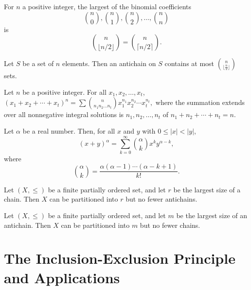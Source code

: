 \begin{corollary}
    \label{cor:5.3.2}
For \( n \) a positive integer, the largest of the binomial coefficients
\[
\binom{n}{0}, \binom{n}{1}, \binom{n}{2}, \ldots, \binom{n}{n}
\]
is
\[
\binom{n}{\lfloor n/2 \rfloor} = \binom{n}{\lceil n/2 \rceil}.
\]
\end{corollary}

\begin{theorem}
    \label{thm:5.3.3}
Let \( S \) be a set of \( n \) elements. Then an antichain on \( S \) contains at most \( \binom{n}{\lfloor \frac{n}{2} \rfloor} \) sets.
\end{theorem}

\begin{theorem}
    \label{thm:5.4.1}
Let \( n \) be a positive integer. For all \( x_1, x_2, \ldots, x_t \),
$
(x_1 + x_2 + \cdots + x_t)^n = \sum \binom{n}{n_1n_2\ldots n_t} x_1^{n_1} x_2^{n_2} \cdots x_t^{n_t},
$
where the summation extends over all nonnegative integral solutions is \( n_1, n_2, \ldots, n_t \) of \( n_1 + n_2 + \cdots + n_t = n \).
\end{theorem}

\begin{theorem}
    \label{thm:5.5.1}
Let \( \alpha \) be a real number. Then, for all \( x \) and \( y \) with \( 0 \leq |x| < |y| \),
\[
(x + y)^\alpha = \sum_{k=0}^{\infty} \binom{\alpha}{k} x^k y^{\alpha-k},
\]
where
\[
\binom{\alpha}{k} = \frac{\alpha(\alpha - 1) \cdots (\alpha - k + 1)}{k!}.
\]
\end{theorem}

\begin{theorem}
    \label{thm:5.6.1}
Let \((X, \leq)\) be a finite partially ordered set, and let \( r \) be the largest size of a chain. Then \( X \) can be partitioned into \( r \) but no fewer antichains.
\end{theorem}


\begin{theorem}
    \label{thm:5.6.2}
Let \((X, \leq)\) be a finite partially ordered set, and let \(m\) be the largest size of an antichain. Then \(X\) can be partitioned into \(m\) but no fewer chains.
\end{theorem}



\chapter{The Inclusion-Exclusion Principle and Applications}

